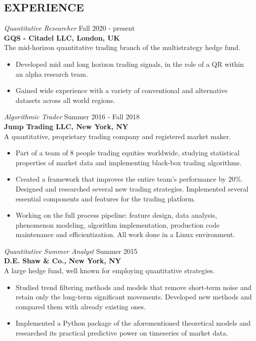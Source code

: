 \documentclass[margin]{res}
\begin{document}
\begin{resume}
  \section{EXPERIENCE}
  {\sl Quantitative Researcher} \hfill Fall 2020 - present \\
  \textbf{GQS - Citadel LLC, London, UK} \\
  The mid-horizon quantitative trading branch of the multistrategy hedge fund.
  \begin{itemize}  \itemsep -2pt %
    \item Developed mid and long horizon trading signals, in the role of a QR within
      an alpha research team.
    \item Gained wide experience with a variety of conventional and alternative datasets
      across all world regions.
  \end{itemize}
  {\sl Algorithmic Trader} \hfill Summer 2016 - Fall 2018 \\
  \textbf{Jump Trading LLC, New York, NY} \\
  A quantitative, proprietary trading company and registered market maker.
  \begin{itemize}  \itemsep -2pt %
    \item Part of a team of 8 people trading equities worldwide,
      studying statistical properties of market data and implementing black-box
      trading algorithms.
    \item Created a framework that improves the entire team's performance by 20\%.
      Designed and researched several new trading strategies. Implemented several 
      essential components and features for the trading platform.
    \item Working on the full process pipeline: feature design, data analysis,
      phenomenon modeling, algorithm implementation, production code maintenance
      and efficientization. All work done in a Linux environment.
  \end{itemize}


  {\sl Quantitative Summer Analyst} \hfill Summer 2015 \\
  \textbf{D.E. Shaw \& Co., New York, NY} \\
  A large hedge fund, well known for employing quantitative strategies.
  \begin{itemize}  \itemsep -2pt %
    \item Studied trend filtering methods and models
      that remove short-term noise and retain only the long-term significant movements.
      Developed new methods and compared them with already existing ones.
    \item Implemented a Python package of the aforementioned theoretical models
      and researched its practical predictive power on timeseries of market data.
  \end{itemize}


\end{resume}
\end{document}

